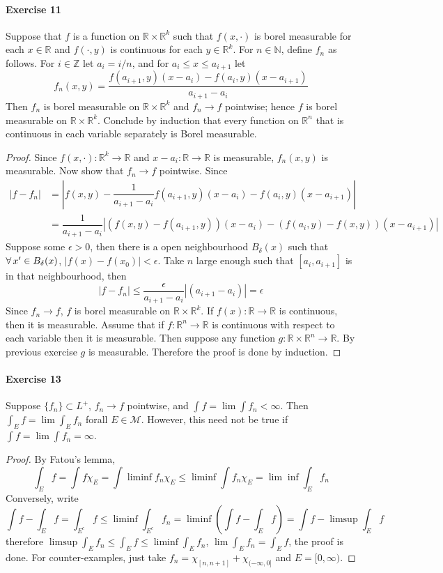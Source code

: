\paragraph{Exercise 11}
Suppose that $f$ is a function on $\mathbb{R}\times\mathbb{R}^k$ such that $f(x,\cdot)$ is borel measurable for each $x\in\mathbb{R}$ and $f(\cdot,y)$ is continuous for each $y\in\mathbb{R}^k$. For $n\in\mathbb{N}$, define $f_n$ as follows. For $i\in\mathbb{Z}$ let $a_i=i/n$, and for $a_i\le x\le a_{i+1}$ let
$$
f_n(x,y)=\dfrac{f(a_{i+1},y)(x-a_i)-f(a_i,y)(x-a_{i+1})}{a_{i+1}-a_i}
$$
Then $f_n$ is borel measurable on $\mathbb{R}\times\mathbb{R}^k$ and $f_n\to f$ pointwise; hence $f$ is borel measurable on $\mathbb{R}\times\mathbb{R}^k$. Conclude by induction that every function on $\mathbb{R}^n$ that is continuous in each variable separately is Borel measurable.
\begin{proof}
    Since $f(x,\cdot):\mathbb{R}^k\to\mathbb{R}$ and $x-a_i:\mathbb{R}\to\mathbb{R}$ is measurable, $f_n(x,y)$ is measurable. Now show that $f_n\to f$ pointwise. Since
    \begin{align*}
        |f-f_n|&=|f(x,y)-\dfrac{1}{a_{i+1}-a_i}f(a_{i+1},y)(x-a_i)-f(a_i,y)(x-a_{i+1})|\\
        &=\dfrac{1}{a_{i+1}-a_i}|(f(x,y)-f(a_{i+1},y))(x-a_{i})-(f(a_i,y)-f(x,y))(x-a_{i+1})|
    \end{align*}
    Suppose some $\epsilon>0$, then there is a open neighbourhood $B_\delta(x)$ such that $\forall\, x'\in B_\delta(x)$, $|f(x)-f(x_0)|<\epsilon$. Take $n$ large enough such that $[a_i,a_{i+1}]$ is in that neighbourhood, then
    $$
    |f-f_n|\le\dfrac{\epsilon}{a_{i+1}-a_i}|(a_{i+1}-a_i)|=\epsilon
    $$
    Since $f_n\to f$, $f$ is borel measurable on $\mathbb{R}\times\mathbb{R}^k$. If $f(x):\mathbb{R}\to\mathbb{R}$ is continuous, then it is measurable. Assume that if $f:\mathbb{R}^n\to\mathbb{R}$ is continuous with respect to each variable then it is measurable. Then suppose any function $g:\mathbb{R}\times\mathbb{R}^n\to\mathbb{R}$. By previous exercise $g$ is measurable. Therefore the proof is done by induction.
\end{proof}
\paragraph{Exercise 13}
Suppose $\{f_n\}\subset L^+$, $f_n\to f$ pointwise, and $\int f=\lim\int f_n<\infty$. Then $\int_E f=\lim\int_E f_n$ forall $E\in\mathcal{M}$. However, this need not be true if $\int f=\lim\int f_n=\infty$.
\begin{proof}
    By Fatou's lemma,
    $$
    \int_Ef=\int f\chi_E=\int\liminf f_n\chi_E\le\liminf\int f_n\chi_E=\lim\inf\int_Ef_n
    $$
    Conversely, write
    $$
    \int f-\int_E f=\int_{E^c} f\le\liminf\int_{E^c}f_n=\liminf(\int f-\int_E f)=\int f-\limsup\int_E f
    $$
    therefore $\limsup\int_Ef_n\le\int_E f\le\liminf\int_Ef_n$, $\lim\int_Ef_n=\int_Ef$,
    the proof is done. For counter-examples, just take $f_n=\chi_{[n,n+1]}+\chi_{(-\infty,0]}$ and $E=[0,\infty)$.
\end{proof}
